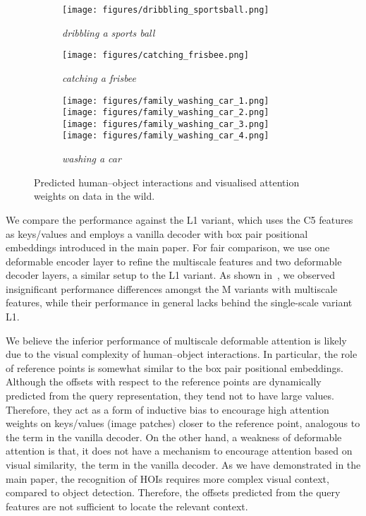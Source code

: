 \documentclass[10pt,twocolumn,letterpaper]{article}
\begin{document}
\begin{figure}[t]\captionsetup[subfigure]{font=footnotesize}
   \begin{subfigure}[t]{0.495\linewidth}
     \centering
     \texttt{[image: figures/dribbling\_sportsball.png]}
     \caption{\textit{dribbling a sports ball}}
     \label{fig:qual-dribbling-sportsball}
   \end{subfigure}
   \hfill \begin{subfigure}[t]{0.495\linewidth}
     \centering
     \texttt{[image: figures/catching\_frisbee.png]}
     \caption{\textit{catching a frisbee}}
     \label{fig:qual-catching-frisbee}
   \end{subfigure}

   \begin{subfigure}[t]{\linewidth}
      \centering
      \texttt{[image: figures/family\_washing\_car\_1.png]}
      \hfill \texttt{[image: figures/family\_washing\_car\_2.png]}
      \vfill \texttt{[image: figures/family\_washing\_car\_3.png]}
      \hfill \texttt{[image: figures/family\_washing\_car\_4.png]}
      \caption{\textit{washing a car}}
      \label{fig:qual-washing-car}
    \end{subfigure}
   
   \vspace{5px}
   \caption{Predicted human--object interactions and visualised attention weights on data in the wild.}
   \label{fig:add-qual}
\end{figure}

We compare the performance against the L1 variant, which uses the C5 features as keys/values and employs a vanilla decoder with box pair positional embeddings introduced in the main paper. For fair comparison, we use one deformable encoder layer to refine the multiscale features and two deformable decoder layers, a similar setup to the L1 variant. As shown in~, we observed insignificant performance differences amongst the M variants with multiscale features, while their performance in general lacks behind the single-scale variant L1.

We believe the inferior performance of multiscale deformable attention is likely due to the visual complexity of human--object interactions. In particular, the role of reference points is somewhat similar to the box pair positional embeddings. Although the offsets with respect to the reference points are dynamically predicted from the query representation, they tend not to have large values. Therefore, they act as a form of inductive bias to encourage high attention weights on keys/values (image patches) closer to the reference point, analogous to the  term in the vanilla decoder. On the other hand, a weakness of deformable attention is that, it does not have a mechanism to encourage attention based on visual similarity,~\ie the  term in the vanilla decoder. As we have demonstrated in the main paper, the recognition of HOIs requires more complex visual context, compared to object detection. Therefore, the offsets predicted from the query features are not sufficient to locate the relevant context.
\end{document}
